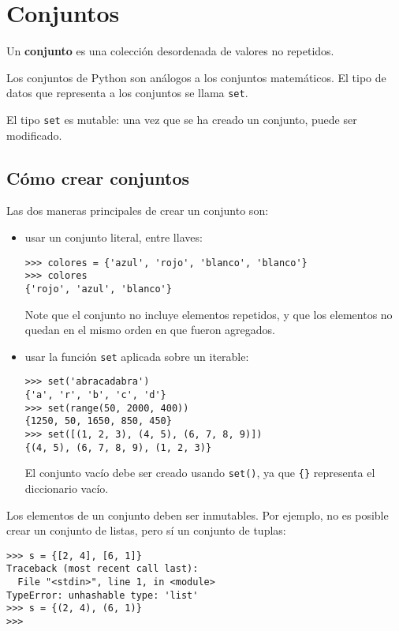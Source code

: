 \chapter{Conjuntos}

Un \textbf{conjunto} es una colección desordenada de valores no
repetidos.

Los conjuntos de Python son análogos a los conjuntos matemáticos. El
tipo de datos que representa a los conjuntos se llama \lstinline!set!.

El tipo \lstinline!set! es mutable: una vez que se ha creado un
conjunto, puede ser modificado.

\section{Cómo crear conjuntos}

Las dos maneras principales de crear un conjunto son:

\begin{itemize}
\item
  usar un conjunto literal, entre llaves:

\begin{lstlisting}
>>> colores = {'azul', 'rojo', 'blanco', 'blanco'}
>>> colores
{'rojo', 'azul', 'blanco'}
\end{lstlisting}

  Note que el conjunto no incluye elementos repetidos, y que los
  elementos no quedan en el mismo orden en que fueron agregados.
\item
  usar la función \lstinline!set! aplicada sobre un iterable:

\begin{lstlisting}
>>> set('abracadabra')
{'a', 'r', 'b', 'c', 'd'}
>>> set(range(50, 2000, 400))
{1250, 50, 1650, 850, 450}
>>> set([(1, 2, 3), (4, 5), (6, 7, 8, 9)])
{(4, 5), (6, 7, 8, 9), (1, 2, 3)}
\end{lstlisting}

  El conjunto vacío debe ser creado usando \lstinline!set()!, ya que
  \lstinline!{}! representa el diccionario vacío.
\end{itemize}

Los elementos de un conjunto deben ser inmutables. Por ejemplo, no es
posible crear un conjunto de listas, pero sí un conjunto de tuplas:

\begin{lstlisting}
>>> s = {[2, 4], [6, 1]}
Traceback (most recent call last):
  File "<stdin>", line 1, in <module>
TypeError: unhashable type: 'list'
>>> s = {(2, 4), (6, 1)}
>>>
\end{lstlisting}

